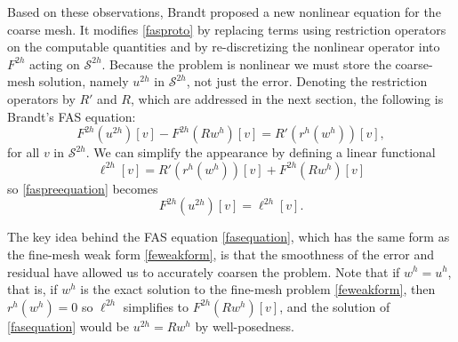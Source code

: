\documentclass[letterpaper,final,12pt,reqno]{amsart}
\begin{document}
Based on these observations, Brandt proposed a new nonlinear equation for the coarse mesh.  It modifies \eqref{fasproto} by replacing terms using restriction operators on the computable quantities and by re-discretizing the nonlinear operator into $F^{2h}$ acting on $\mathcal{S}^{2h}$.  Because the problem is nonlinear we must store the coarse-mesh solution, namely $u^{2h}$ in $\mathcal{S}^{2h}$, not just the error.  Denoting the restriction operators by $R'$ and $R$, which are addressed in the next section, the following is Brandt's FAS equation:
\begin{equation}
  F^{2h}(u^{2h})[v] - F^{2h}(R w^h)[v] = R' (r^h(w^h))[v], \label{faspreequation}
\end{equation}
for all $v$ in $\mathcal{S}^{2h}$.  We can simplify the appearance by defining a linear functional
\begin{equation}
  \ell^{2h}[v] = R' (r^h(w^h))[v] + F^{2h}(R w^h)[v] \label{fasell}
\end{equation}
so \eqref{faspreequation} becomes
\begin{equation}
  F^{2h}(u^{2h})[v] = \ell^{2h}[v]. \label{fasequation}
\end{equation}

The key idea behind the FAS equation \eqref{fasequation}, which has the same form as the fine-mesh weak form \eqref{feweakform}, is that the smoothness of the error and residual have allowed us to accurately coarsen the problem.  Note that if $w^h=u^h$, that is, if $w^h$ is the exact solution to the fine-mesh problem \eqref{feweakform}, then $r^h(w^h)=0$ so $\ell^{2h}$ simplifies to $F^{2h}(R w^h)[v]$, and the solution of \eqref{fasequation} would be $u^{2h} = R w^h$ by well-posedness.
\end{document}
